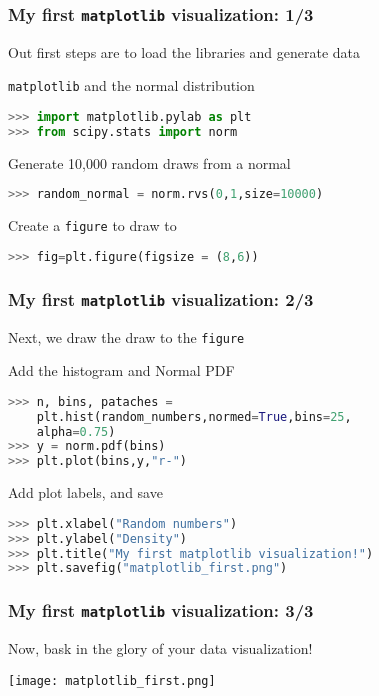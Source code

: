 \documentclass[xcolor=dvipsnames, 9pt]{beamer}
\begin{document}
\begin{frame}[fragile]
    \frametitle{My first \texttt{matplotlib} visualization: 1/3}
    Out first steps are to load the libraries and generate data
    \begin{block}{\texttt{matplotlib} and the normal distribution}
        \begin{lstlisting}[language=Python]
>>> import matplotlib.pylab as plt
>>> from scipy.stats import norm
        \end{lstlisting}
    \end{block}
    \begin{block}{Generate 10,000 random draws from a normal}
        \begin{lstlisting}[language=Python]
>>> random_normal = norm.rvs(0,1,size=10000)
        \end{lstlisting}
    \end{block}
    \begin{block}{Create a \texttt{figure} to draw to}
        \begin{lstlisting}[language=Python]
>>> fig=plt.figure(figsize = (8,6))
        \end{lstlisting}
    \end{block}
\end{frame}

\begin{frame}[fragile]
    \frametitle{My first \texttt{matplotlib} visualization: 2/3}
    Next, we draw the draw to the \texttt{figure}
    \begin{block}{Add the histogram and Normal PDF}
        \begin{lstlisting}[language=Python]
>>> n, bins, pataches = 
    plt.hist(random_numbers,normed=True,bins=25,
    alpha=0.75)  
>>> y = norm.pdf(bins)
>>> plt.plot(bins,y,"r-")
        \end{lstlisting}
    \end{block}
    \begin{block}{Add plot labels, and save}
        \begin{lstlisting}[language=Python]
>>> plt.xlabel("Random numbers")
>>> plt.ylabel("Density")
>>> plt.title("My first matplotlib visualization!")
>>> plt.savefig("matplotlib_first.png")
        \end{lstlisting}
    \end{block}
\end{frame}

\begin{frame}[fragile]
    \frametitle{My first \texttt{matplotlib} visualization: 3/3}
    Now, bask in the glory of your data visualization!
    \begin{center}
        \texttt{[image: matplotlib\_first.png]}
    \end{center}
\end{frame}
\end{document}
